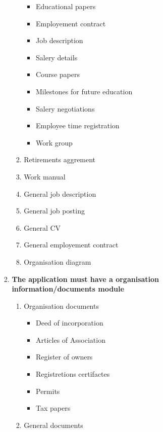 \begin{enumerate}
\begin{enumerate}
\begin{enumerate}
\begin{enumerate}
\begin{itemize}
                    \item Educational papers
                    \item Employement contract
                    \item Job description
                    \item Salery details
                    \item Course papers
                    \item Milestones for future education
                    \item Salery negotiations
                    \item Employee time registration
                    \item Work group
                \end{itemize}
                \item Retirements aggrement
                \item Work manual
                \item General job description
                \item General job posting
                \item General CV
                \item General employement contract
                \item Organisation diagram
            \end{enumerate}
            \item \textbf{The application must have a organisation information/documents module}
            \begin{enumerate}
                \item Organisation documents
                \begin{itemize}\textbf{\textit{skal skrives om til flydende tekst}}
                    \item Deed of incorporation
                    \item Articles of Association
                    \item Register of owners
                    \item Registretions certifactes
                    \item Permits
                    \item Tax papers
                \end{itemize}
                \item General documents
                \begin{itemize}

\end{itemize}
\end{enumerate}
\end{enumerate}
\end{enumerate}
\end{enumerate}
